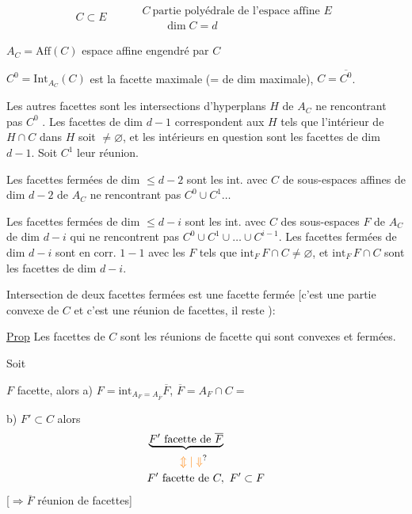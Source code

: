 \[
C\subset E \qquad
\begin{aligned}
&C\ \text{partie polyédrale de l'espace affine }E\\
&\qquad \dim C=d
\end{aligned}
\]

$A_C=\mathrm{Aff}(C)$ espace affine engendré par $C$

$C^0=\mathrm{Int}_{A_C}(C)$ est la facette maximale (= de dim maximale), $C=\overline{C^0}$.

Les autres facettes  sont les intersections  d'hyperplans $H$
de $A_C$ ne rencontrant pas $C^0$ . Les facettes
 de dim $d-1$ correspondent  aux
$H$ tels que l'intérieur de $H\cap C$ dans $H$ soit $\ne\varnothing$,
et les intérieurs en question sont les facettes  de
dim $d-1$. Soit $C^1$ leur réunion.

Les facettes fermées de dim $\leq d-2$ sont les int. avec
$C$ de sous-espaces affines de dim $d-2$ de $A_C$ ne
rencontrant pas $C^0\cup C^1\ldots$

Les facettes fermées de dim $\leq d-i$ sont les int.
 avec $C$ des sous-espaces  $F$ de $A_C$ de dim
$d-i$  qui ne rencontrent pas $C^0\cup C^1\cup\ldots\cup C^{i-1}$.
Les facettes fermées de dim $d-i$ sont en
corr. $1-1$ avec les $F$ tels que $\mathrm{int}_{F}\,F\cap C\ne\varnothing$,
et  $\mathrm{int}_F\,F\cap C$ sont les facettes de dim $d-i$.

Intersection de deux facettes fermées est une
facette fermée [c'est une partie convexe de $C$ et
c'est une réunion de facettes, il reste ):

\uline{Prop} Les facettes  de $C$ sont les réunions
de facette qui sont convexes et fermées.

Soit

$F$ facette, alors  a) $F=\mathrm{int}_{A_F=A_{\overline F}}\overline F$, $\overline F=A_F\cap C=$


b) $F'\subset C$ alors
\[
\begin{aligned}
&\underbrace{F'\ \text{facette de }\overline F}\\
&\hspace{3em}\unsure{\Updownarrow|\Downarrow}\\
&F'\ \text{facette de }C,\ F'\subset F
\end{aligned}
\]
[$\Rightarrow\overline F$ réunion de facettes]

